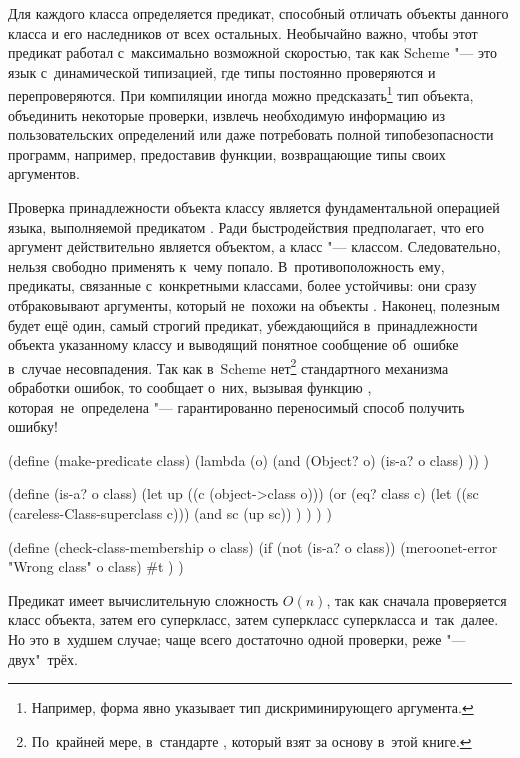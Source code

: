 Для каждого класса {\Meroonet} определяется предикат, способный отличать объекты
данного класса и его наследников от всех остальных. Необычайно важно, чтобы этот
предикат работал с~максимально возможной скоростью, так как Scheme "--- это язык
с~динамической типизацией, где типы постоянно проверяются и перепроверяются. При
компиляции иногда можно предсказать\footnote{Например, форма 
явно указывает тип дискриминирующего аргумента.} тип объекта, объединить
некоторые проверки, извлечь необходимую информацию из пользовательских
определений или даже потребовать полной типобезопасности программ, например,
предоставив функции, возвращающие типы своих аргументов.

Проверка принадлежности объекта классу является фундаментальной операцией языка,
выполняемой предикатом . Ради быстродействия  предполагает,
что его аргумент действительно является объектом, а класс "--- классом.
Следовательно, нельзя свободно применять  к~чему попало.
В~противоположность ему, предикаты, связанные с~конкретными классами, более
устойчивы: они сразу отбраковывают аргументы, который не~похожи на объекты
{\Meroonet}. Наконец, полезным будет ещё один, самый строгий предикат,
убеждающийся в~принадлежности объекта указанному классу и выводящий понятное
сообщение об~ошибке в~случае несовпадения. Так как в~Scheme нет\footnote{%
По~крайней мере, в~стандарте \RnRS, который взят за основу в~этой книге.}
стандартного механизма обработки ошибок, то {\Meroonet} сообщает о~них, вызывая
функцию , которая\textdots\ не~определена "--- гарантированно
переносимый способ получить ошибку!

\begin{code:lisp}
(define (make-predicate class)
  (lambda (o) (and (Object? o)
                   (is-a? o class) )) )

(define (is-a? o class)
  (let up ((c (object->class o)))
    (or (eq? class c)
        (let ((sc (careless-Class-superclass c)))
          (and sc (up sc)) ) ) ) )

(define (check-class-membership o class)
  (if (not (is-a? o class))
    (meroonet-error "Wrong class" o class)
    #t ) )
\end{code:lisp}

Предикат  имеет вычислительную сложность $O(n)$, так как сначала
проверяется класс объекта, затем его суперкласс, затем суперкласс суперкласса
и~так~далее. Но это в~худшем случае; чаще всего достаточно одной проверки,
реже "--- двух"~трёх.

